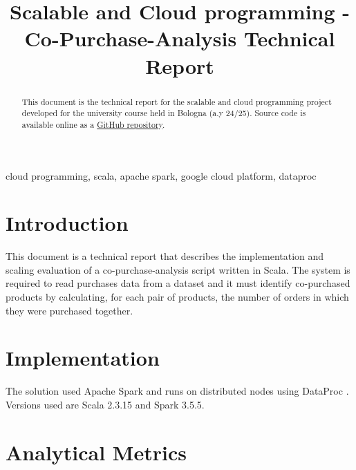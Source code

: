 \documentclass[conference]{IEEEtran}
\begin{document}
\title{Scalable and Cloud programming - Co-Purchase-Analysis Technical Report}

\author{
}

\maketitle

\begin{abstract}
This document is the technical report for the scalable and cloud programming project developed for the university course held in Bologna (a.y 24/25). Source code is available online as a \href{https://github.com/micheledinelli/scalable-cloud-programming}{GitHub repository}.
\end{abstract}

\begin{IEEEkeywords}
cloud programming, scala, apache spark, google cloud platform, dataproc
\end{IEEEkeywords}

\section{Introduction}
This document is a technical report that describes the implementation and scaling evaluation of a co-purchase-analysis script written in Scala. The system is required to read purchases data from a dataset \cite{dataset} and it must identify co-purchased products by calculating, for each pair of products, the number of orders in which they were purchased together.

\section{Implementation}
The solution used Apache Spark \cite{10.1145/2934664} and runs on distributed nodes using DataProc \cite{dataproc}. Versions used are Scala 2.3.15 and Spark 3.5.5.

\section{Analytical Metrics}
\end{document}
